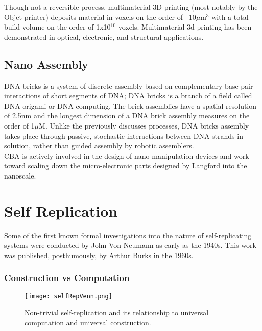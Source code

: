 {Though not a reversible process, multimaterial 3D printing (most notably by the Objet printer) deposits material in voxels on the order of ~10$\mu$m$^{3}$ with a total build volume on the order of 1x10$^{10}$ voxels\cite{Objet1000}.  Multimaterial 3d printing has been demonstrated in optical\cite{Willis2012}, electronic\cite{Ahn2009}, and structural applications\cite{Skouras2013}\cite{Schumacher}\cite{Bacher2014}.

\subsection{Nano Assembly}

DNA bricks is a system of discrete assembly based on complementary base pair interactions of short segments of DNA\cite{Ke2012}; DNA bricks is a branch of a field called DNA origami\cite{Rothemund2006} or DNA computing\cite{Seeman1982}\cite{Adleman1994}.  The brick assemblies have a spatial resolution of 2.5nm and the longest dimension of a DNA brick assembly measures on the order of 1$\mu$M\cite{Ke2014}.  Unlike the previously discusses processes, DNA bricks assembly takes place through passive, stochastic interactions between DNA strands in solution, rather than guided assembly by robotic assemblers.
\\

CBA is actively involved in the design of nano-manipulation devices and work toward scaling down the micro-electronic parts designed by Langford\cite{Langford2014} into the nanoscale.

\section{Self Replication}

Some of the first known formal investigations into the nature of self-replicating systems were conducted by John Von Neumann as early as the 1940s.  This work was published, posthumously, by Arthur Burks in the 1960s\cite{Burks1969}.

\subsubsection{Construction vs Computation}

\begin{figure}
  \texttt{[image: selfRepVenn.png]}
  \caption{Non-trivial self-replication and its relationship to universal computation and universal construction.}
  \label{fig:selfRepVenn}
\end{figure}


}
